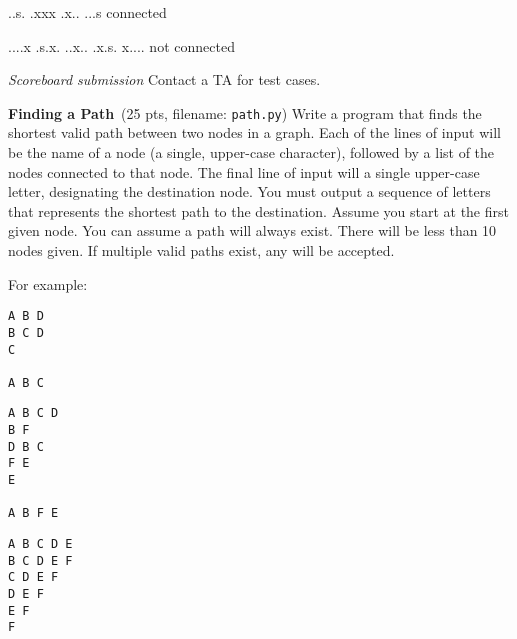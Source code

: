 \documentclass[11pt]{cselabheader}
\newcommand{\cop}[3]{\textbf{#1}~(#2 pts, filename: \texttt{#3})\quad}
\theoremstyle{plain}
\begin{document}
\begin{enumerate}
    \begin{verbatimcode}
..s.
.xxx
.x..
...s
connected
    \end{verbatimcode}

    \begin{verbatimcode}
....x
.s.x.
..x..
.x.s.
x....
not connected
    \end{verbatimcode}

    \textit{Scoreboard submission} Contact a TA for test cases.

    

  \item \cop{Finding a Path}{25}{path.py}
    Write a program that finds the shortest valid path between two nodes in a graph.
    Each of the lines of input will be the name of a node (a single, upper-case
    character), followed by a list of the nodes connected to that node. The final
    line of input will a single upper-case letter, designating the destination node.
    You must output a sequence of letters that represents the shortest path to the
    destination. Assume you start at the first given node. You can assume a path will
    always exist. There will be less than 10 nodes given. If multiple valid paths
    exist, any will be accepted.
    
    For example:\\
    \begin{minipage}{.33\linewidth}
      \begin{minipage}{.8\linewidth}
        \begin{lstlisting}[style=bash]
A B D
B C D
C

A B C
        \end{lstlisting}
      \end{minipage}
    \end{minipage}
    \begin{minipage}{.33\linewidth}
      \begin{minipage}{.8\linewidth}
        \begin{lstlisting}[style=bash]
A B C D
B F
D B C
F E
E

A B F E
        \end{lstlisting}
      \end{minipage}
    \end{minipage}
    \begin{minipage}{.33\linewidth}
      \begin{minipage}{.8\linewidth}
        \begin{lstlisting}[style=bash]
A B C D E
B C D E F
C D E F
D E F
E F
F


\end{lstlisting}
\end{minipage}
\end{minipage}
\end{enumerate}
\end{document}
